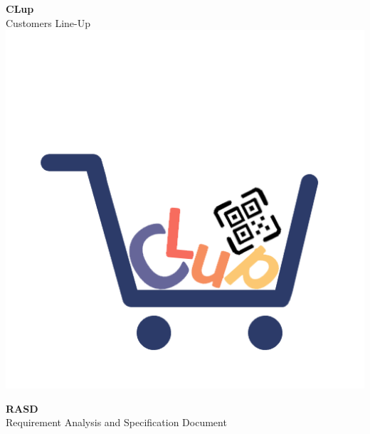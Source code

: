 



\begin{titlepage}
  \begin{center}

    \HUGE \textbf{CLup} \\[0.5cm]
    \LARGE Customers Line-Up \\[0.5cm]
    \includegraphics[scale=0.5]{../logo/clup_logo_nobg.png}

    \vfill

    \Huge \textbf{RASD} \\
    \LARGE Requirement Analysis and Specification Document \\[2cm]


\end{center}
\end{titlepage}
